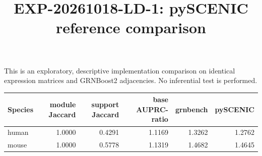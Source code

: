 \documentclass{article}
\title{EXP-20261018-LD-1: pySCENIC reference comparison}
\begin{document}
\maketitle
This is an exploratory, descriptive implementation comparison on identical expression
matrices and GRNBoost2 adjacencies. No inferential test is performed.
\begin{center}
\begin{tabular}{lrrrrr}
\toprule
Species & module Jaccard & support Jaccard & base AUPRC-ratio & grnbench & pySCENIC \\
\midrule
human & 1.0000 & 0.4291 & 1.1169 & 1.3262 & 1.2762 \\
mouse & 1.0000 & 0.5778 & 1.1319 & 1.4682 & 1.4645 \\
\bottomrule
\end{tabular}
\end{center}
\end{document}
